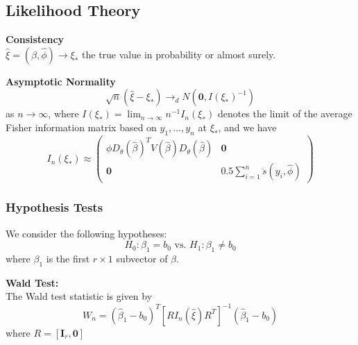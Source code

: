 \documentclass[12pt]{article}
\newcommand{\sumn}{\sum_{i=1}^n}
\newcommand{\bhat}{\hat{\beta}}
\numberwithin{equation}{section}
\begin{document}
\subsection{Likelihood Theory}
\textbf{Consistency} \\
$\hat{\xi} = (\hat{\beta}, \hat{\phi}) \to \xi_*$ the true value in probability or almost surely.

\textbf{Asymptotic Normality}
\begin{equation*}
  \sqrt{n}(\hat{\xi} - \xi_*) \to_d N(\mathbf{0}, I(\xi_*)^{-1})
\end{equation*}
as $n \to \infty$, where 
$I(\xi_*) = \lim_{n \to \infty} n^{-1} I_n(\xi_*)$ denotes the limit of the average Fisher information matrix based on $y_1, \ldots, y_n$ at $\xi_*$, and we have
\begin{equation*}
  I_n(\xi_*) \approx
  \begin{pmatrix}
    \phi D_{\theta}(\bhat)^T V(\bhat) D_\theta(\bhat) & \mathbf{0} \\
    \mathbf{0} & 0.5 \sumn \ddot{s}(y_i, \hat{\phi})
  \end{pmatrix}
\end{equation*}

\subsubsection{Hypothesis Tests}
We consider the following hypotheses:
\begin{equation*}
  H_0: \beta_1 = b_0 \text{ vs. } H_1: \beta_1 \ne b_0
\end{equation*}
where $\beta_1$ is the first $r \times 1$ subvector of $\beta$.

\textbf{Wald Test:} \\
The Wald test statistic is given by
\begin{equation*}
  W_n = (\bhat_1 - b_0)^T [RI_n(\hat{\xi}) R^T]^{-1} (\bhat_1 - b_0)
\end{equation*}
where $R = [\mathbf{I}_r, \mathbf{0}]$
\end{document}
